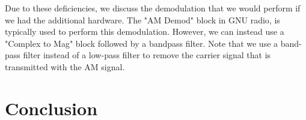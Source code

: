 \documentclass{article}
\begin{document}
Due to these deficiencies, we discuss the demodulation that we would perform if we had the additional hardware. The "AM Demod" block in GNU radio, is typically used to perform this demodulation. However, we can instead use a "Complex to Mag" block followed by a bandpass filter. Note that we use a band-pass filter instead of a low-pass filter to remove the carrier signal that is transmitted with the AM signal.
  
\section{Conclusion}

%
%
	
\end{document}
